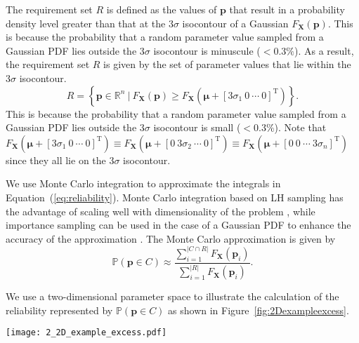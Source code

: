 The requirement set $R$ is defined as the values of $\mathbf{p}$ that result in a probability density level greater than that at the $3{\sigma}$ isocontour of a Gaussian $F_\mathbf{X}(\mathbf{p})$. This is because the probability that a random parameter value sampled from a Gaussian \ac{PDF} lies outside the $3{\sigma}$ isocontour is minuscule ($<0.3\%$). As a result, the requirement set $R$ is given by the set of parameter values that lie within the $3\sigma$ isocontour.
%
\begin{equation} \label{eq:requirementsetgaussian}
	\textit{R} = \left\{\mathbf{p} \in \mathbb{R}^n~|~F_\mathbf{X}(\mathbf{p}) \geq F_\mathbf{X}(\boldsymbol{\mu} + \left[3\sigma_1~0~\cdots~0\right]^\mathrm{T}) \right\}.
\end{equation}
%
This is because the probability that a random parameter value sampled from a Gaussian \ac{PDF} lies outside the $3\sigma$ isocontour is small ($<0.3\%$). Note that $F_\mathbf{X}(\boldsymbol{\mu} + \left[3\sigma_1~0~\cdots~0\right]^\mathrm{T}) \equiv F_\mathbf{X}(\boldsymbol{\mu} + \left[0~3\sigma_2~\cdots~0\right]^\mathrm{T}) \equiv F_\mathbf{X}(\boldsymbol{\mu} + \left[0~0~\cdots~3\sigma_n\right]^\mathrm{T})$ since they all lie on the $3\sigma$ isocontour.

We use Monte Carlo integration to approximate the integrals in Equation~(\ref{eq:reliability}). Monte Carlo integration based on \acf{LH} sampling has the advantage of scaling well with dimensionality of the problem \cite{Magnusen1997,Zhang2016}, while importance sampling can be used in the case of a Gaussian \ac{PDF} to enhance the accuracy of the approximation \cite{Frangopol2003a,ForouzandehShahraki2014,Kleiber2004}. The Monte Carlo approximation is given by
%
\begin{equation} \label{eq:reliabilitymontecarlo}
	\mathbb{P}(\mathbf{p} \in C) \approx \dfrac{\sum\limits_{i=1}^{|{C\cap R}|} F_{\mathbf{X}}(\mathbf{p}_i)}{\sum\limits_{i=1}^{|R|} F_{\mathbf{X}}(\mathbf{p}_i)}.
\end{equation}

We use a two-dimensional parameter space to illustrate the calculation of the reliability represented by  $\mathbb{P}(\mathbf{p} \in C)$ as shown in Figure~\ref{fig:2Dexampleexcess}.
%
\begin{figure*}[h]
	\centering
	\texttt{[image: 2\_2D\_example\_excess.pdf]}
	\caption{Buffer and excess relative to a feasibility constraint $g_{f1}(\mathbf{p})$ in the two-dimensional parameter space for uniform (left) and Gaussian (right)  \acp{PDF}}
	\label{fig:2Dexampleexcess}
\end{figure*}

